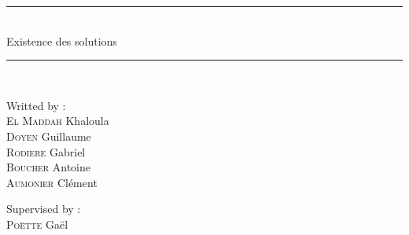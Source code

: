 \documentclass[onecolumn, 12pt, a4paper]{article}
\begin{document}
	
	
	\begin{center}
		
		
		\vspace{50pt}
		\vspace{20pt}
		
		\rule{1\textwidth}{2pt}\\
		\vspace{20pt}
		\huge Existence des solutions\\
		\vspace{20pt}
		\rule{1\textwidth}{2pt}\\ 
		\vspace{10pt}
		
	\end{center}
	
	\noindent
	\begin{minipage}{0.5\textwidth}
		\begin{flushleft}
			\Large Writted by :\\[0.2cm]
			\textsc{El Maddah} Khaloula\\
			\textsc{Doyen} Guillaume\\
			\textsc{Rodiere} Gabriel\\
			\textsc{Boucher} Antoine\\
			\textsc{Aumonier} Clément\\
		\end{flushleft}
	\end{minipage}%
	\begin{minipage}{0.5\textwidth}
		\begin{flushright}
			\Large Supervised by :\\[0.2cm]
			\textsc{Poëtte} Gaël\\
			
		\end{flushright}
	\end{minipage}
	
	\vspace{50 pt}
	
	
	
	
	
	\newpage
	\footnotesize
	
	\tableofcontents
	\setcounter{tocdepth}{1}
	\setcounter{tocdepth}{0}
	\def\restriction#1#2{\mathchoice
		{\setbox1\hbox{${\displaystyle #1}_{\scriptstyle #2}$}
			\restrictionaux{#1}{#2}}
		{\setbox1\hbox{${\textstyle #1}_{\scriptstyle #2}$}
			\restrictionaux{#1}{#2}}
		{\setbox1\hbox{${\scriptstyle #1}_{\scriptscriptstyle #2}$}
			\restrictionaux{#1}{#2}}
		{\setbox1\hbox{${\scriptscriptstyle #1}_{\scriptscriptstyle #2}$}
			\restrictionaux{#1}{#2}}}
	\def\restrictionaux#1#2{{#1\,\smash{\vrule height .8\ht1 depth .85\dp1}}_{\,#2}} 
	
\end{document}
